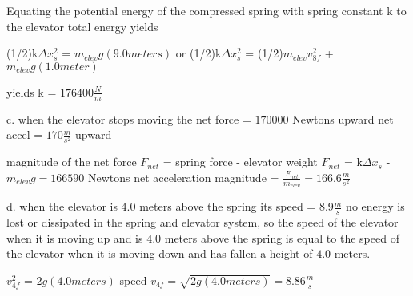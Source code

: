 Equating the potential energy of the compressed spring with spring constant k to the \newline
elevator total energy yields\newline

(1/2)k$\Delta x_{s}^{2}$ = $m_{elev}g(9.0 meters)$\newline
or                                                   
(1/2)k$\Delta x_{s}^{2}$ = (1/2)$m_{elev}v_{8f}^{2}$ + $m_{elev}g(1.0 meter)$\newline
                                                    
yields k = $176400 \frac{N}{m}$\newline
                                                       
c. when the elevator stops moving the net force = $170000$ Newtons upward   net accel = $170 \frac{m}{s^{2}}$ upward\newline
                                                    
magnitude of the net force $F_{net}$ = spring force - elevator weight\newline
$F_{net}$ = k$\Delta x_{s}$ - $m_{elev}g = 166590$ Newtons\newline
net acceleration magnitude = $\frac{F_{net}}{m_{elev}} = 166.6 \frac{m}{s^{2}}$\newline
                                                                           
d. when the elevator is $4.0$ meters above the spring its speed = $8.9 \frac{m}{s}$\newline
no energy is lost or dissipated in the spring and elevator system, so the speed of the elevator when it is\newline
moving up and is $4.0$ meters above the spring is equal to the speed of the elevator when it is moving down\newline
and has fallen a height of $4.0$ meters.\newline

$v_{4f}^{2}$ = $2g(4.0 meters)$\newline
speed $v_{4f} = \sqrt{2g(4.0 meters)} = 8.86 \frac{m}{s}$

